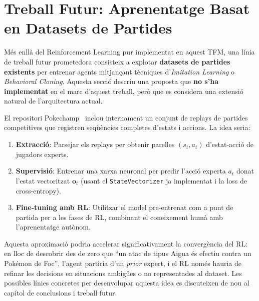 \section{Treball Futur: Aprenentatge Basat en Datasets de Partides}
\label{sec:dataset_training}

Més enllà del Reinforcement Learning pur implementat en aquest TFM, una línia de treball futur prometedora consisteix a explotar \textbf{datasets de partides existents} per entrenar agents mitjançant tècniques d'\textit{Imitation Learning} o \textit{Behavioral Cloning}. Aquesta secció descriu una proposta que \textbf{no s'ha implementat} en el marc d'aquest treball, però que es considera una extensió natural de l'arquitectura actual.

El repositori Pokechamp~\cite{pokechamp} inclou internament un conjunt de replays de partides competitives que registren seqüències completes d'estats i accions. La idea seria:

\begin{enumerate}
    \item \textbf{Extracció}: Parsejar els replays per obtenir parelles $(s_t, a_t)$ d'estat-acció de jugadors experts.
    \item \textbf{Supervisió}: Entrenar una xarxa neuronal per predir l'acció experta $a_t$ donat l'estat vectoritzat $\mathbf{o}_t$ (usant el \texttt{StateVectorizer} ja implementat i la loss de cross-entropy).
    \item \textbf{Fine-tuning amb RL}: Utilitzar el model pre-entrenat com a punt de partida per a les fases de RL, combinant el coneixement humà amb l'aprenentatge autònom.
\end{enumerate}

Aquesta aproximació podria accelerar significativament la convergència del RL: en lloc de descobrir des de zero que ``un atac de tipus Aigua és efectiu contra un Pokémon de Foc'', l'agent partiria d'un \textit{prior} expert, i el RL només hauria de refinar les decisions en situacions ambigües o no representades al dataset. Les possibles línies concretes per desenvolupar aquesta idea es discuteixen de nou al capítol de conclusions i treball futur.
